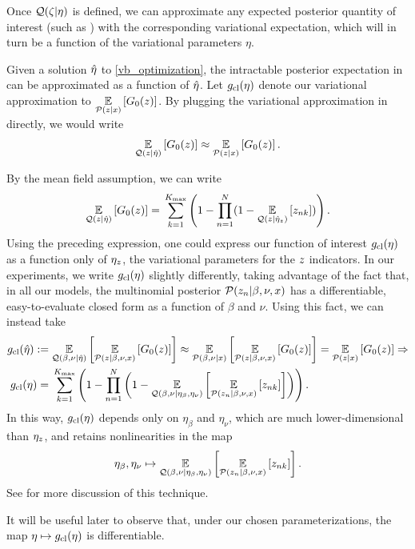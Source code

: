 Once $\mathcal{Q}(\zeta \vert \eta)$ is defined,
we can approximate any expected posterior quantity of interest
(such as ) with the
corresponding variational expectation, which will
in turn be a function of the variational parameters $\eta$.

\begin{ex}
%
Given a solution $\hat\eta$ to \eqref{vb_optimization}, the intractable posterior
expectation in  can be approximated as a
function of $\hat\eta$.  Let $g_{\text{cl}}(\eta)$ denote our variational
approximation to $\underset{\mathcal{P}(z\vert x)}{\mathbb{E}}\left[G_0(z)\right]$.  By plugging the
variational approximation in directly, we would write
%
\begin{align*}
%
\expect{\q(\z\vert\etaopt)}{\nclusters_0(\z)} \approx
    \expect{\p(\z\vert\x)}{\nclusters_0(\z)}.
%
\end{align*}

By the mean field assumption, we can write
%
\begin{align*}
%
\expect{\q(\z \vert \etaopt)}{\nclusters_0(\z)} ={}
    \sumk \left(1 -  \prod_{\n=1}^\N
        (1 - \expect{\q(\z \vert \etaoptz)}{\z_{\n\k}})\right).
%
\end{align*}
%
Using the preceding expression, one could express our function of interest
$g_{\text{cl}}(\eta)$ as a function only of $\eta_z$, the variational
parameters for the $z$ indicators.  In our experiments, we write
$g_{\text{cl}}(\eta)$ slightly differently, taking advantage of the fact that,
in all our models, the multinomial posterior $\mathcal{P}(z_n \vert \beta, \nu, x)$
has a differentiable, easy-to-evaluate closed form as a function of $\beta$ and
$\nu$. Using this fact, we can instead take
%
\begin{align*}
%
\gclustersabbr(\etaopt) :={}&
    \expect{\q(\beta, \nu \vert\etaopt)}{
        \expect{\p(\z \vert \beta, \nu, \x)}{\nclusters_0(\z)}
    } \approx
    \expect{\p(\beta, \nu \vert \x)}{
        \expect{\p(\z \vert \beta, \nu, \x)}{\nclusters_0(\z)}
    }
    = \expect{\p(\z\vert\x)}{\nclusters_0(\z)} \Rightarrow \\
%
\gclustersabbr(\eta) ={}&
    \sumk \left(1 -  \prod_{\n=1}^\N
        \left(1 - \expect{\q(\beta, \nu \vert \eta_\beta, \eta_\nu)}
                    {\expect{\p(\z_{\n} \vert \beta, \nu, \x)}{\z_{\n\k}}}
                    \right)\right).
%
\end{align*}
%
In this way, $g_{\text{cl}}(\eta)$ depends only on $\eta_\beta$ and $\eta_\nu$,
which are much lower-dimensional than $\eta_z$, and retains nonlinearities in
the map
%
\begin{align*}
%
\eta_\beta, \eta_\nu \mapsto \expect{\q(\beta, \nu \vert \eta_\beta,
\eta_\nu)} {\expect{\p(\z_{\n} \vert \beta, \nu, \x)}{\z_{\n\k}}}.
%
\end{align*}
%
See  for more discussion of this technique.

It will be useful later to observe that, under our chosen parameterizations, the
map $\eta \mapsto g_{\text{cl}}(\eta)$ is differentiable.
%
\end{ex}
